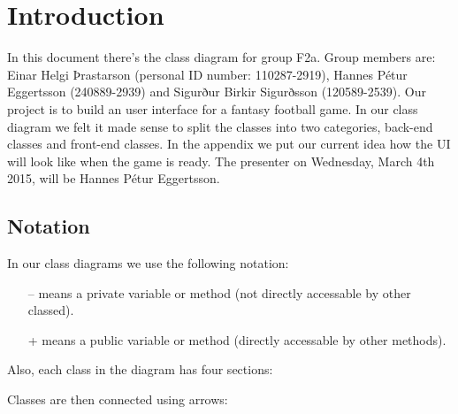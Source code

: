 \documentclass{article}
\begin{document}
\section{Introduction}
In this document there's the class diagram for group F2a. Group members are: Einar Helgi Þrastarson (personal ID number: 110287-2919), Hannes Pétur Eggertsson (240889-2939) and Sigurður Birkir Sigurðsson (120589-2539). Our project is to build an user interface for a fantasy football game. In our class diagram we felt it made sense to split the classes into two categories, back-end classes and front-end classes. In the appendix we put our current idea how the UI will look like when the game is ready. The presenter on Wednesday, March 4th 2015, will be Hannes Pétur Eggertsson.

\subsection{Notation}
In our class diagrams we use the following notation:\vspace*{-0.5cm}
\begin{itemize}\itemsep-4pt
\item[--] means a private variable or method (not directly accessable by other classed).
\item[+] means a public variable or method (directly accessable by other methods).
\end{itemize}


Also, each class in the diagram has four sections:
\begin{center}
\end{center}
Classes are then connected using arrows:
\end{document}
